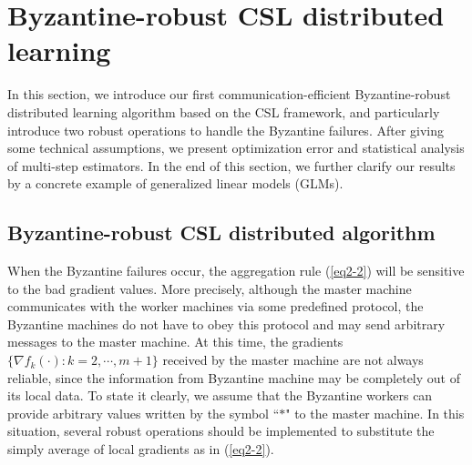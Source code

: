 \documentclass[12pt,a4paper]{article}%
\numberwithin{equation}{section}
\begin{document}
\section{Byzantine-robust CSL distributed learning}\label{sec-BCSL}

In this section, we introduce our first communication-efficient Byzantine-robust distributed learning algorithm based on the CSL framework, and particularly introduce two robust operations to handle the Byzantine failures. After giving some technical assumptions, we  present optimization error and statistical analysis of multi-step estimators. In the end of this section,  we further clarify our results by a concrete example of   generalized linear models (GLMs).

\subsection{Byzantine-robust CSL distributed algorithm}

When the Byzantine failures occur, the aggregation rule  (\ref{eq2-2}) will be sensitive to the bad gradient values. More precisely, although the master machine communicates with the worker machines via some predefined protocol,  the Byzantine machines do not have to obey this protocol and may send arbitrary messages to the master machine. At this time, the gradients $\{\nabla f_k(\cdot): k=2,\cdots,m+1\}$ received by the master machine are not always reliable, since the information from Byzantine machine may be completely out of its local data. To state it clearly, we assume that the Byzantine workers can provide arbitrary values written by the symbol ``$*$" to the master machine. In this situation, several robust operations should be implemented to substitute the simply average of local gradients as in (\ref{eq2-2}).
\end{document}
